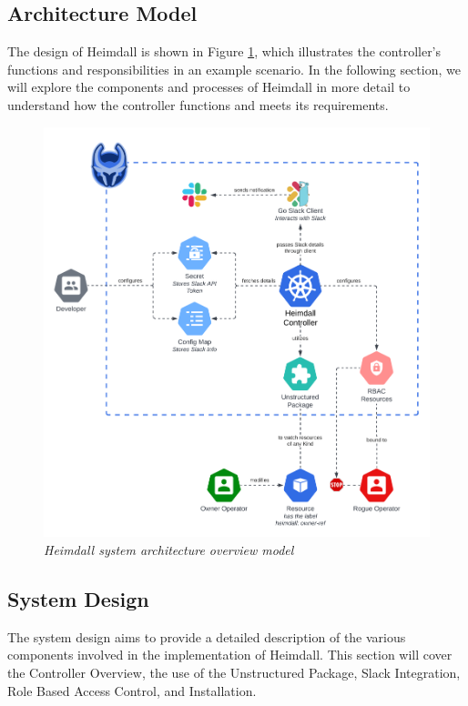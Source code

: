 \documentclass{article}
\begin{document}
\subsection{Architecture Model}

The design of Heimdall is shown in Figure \ref{arch-diag}, which illustrates the controller's functions and responsibilities in an example scenario. In the following section, we will explore the components and processes of Heimdall in more detail to understand how the controller functions and meets its requirements.

\begin{figure}[H]
    \centering
    \includegraphics[width=160mm]{design/arch-diag.png}
    \caption{\emph{Heimdall system architecture overview model}}
    \label{arch-diag}
\end{figure}


\subsection{System Design} \label{design-desc}

The system design aims to provide a detailed description of the various components involved in the implementation of Heimdall. This section will cover the Controller Overview, the use of the Unstructured Package, Slack Integration, Role Based Access Control, and Installation. 
\end{document}
